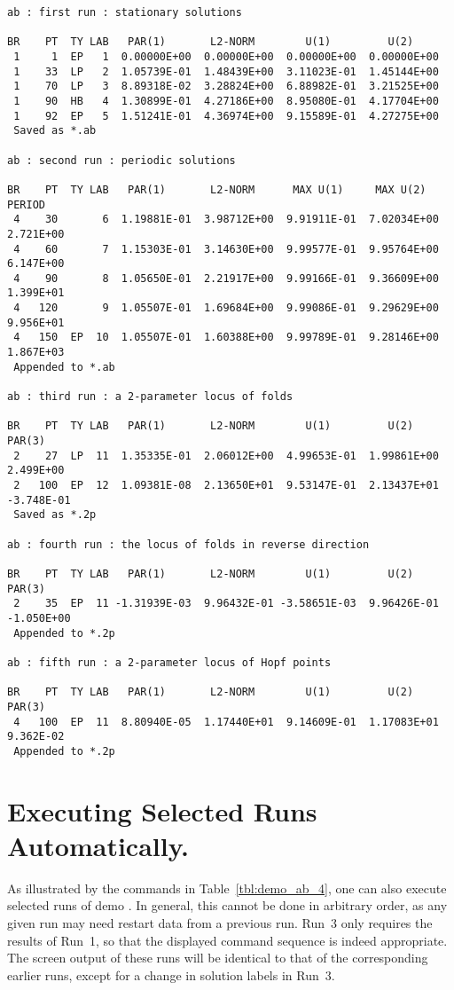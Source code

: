 \begin{center}
\vspace{-0.2in}
\begin{verbatim}
ab : first run : stationary solutions
 
BR    PT  TY LAB   PAR(1)       L2-NORM        U(1)         U(2)     
 1     1  EP   1  0.00000E+00  0.00000E+00  0.00000E+00  0.00000E+00
 1    33  LP   2  1.05739E-01  1.48439E+00  3.11023E-01  1.45144E+00
 1    70  LP   3  8.89318E-02  3.28824E+00  6.88982E-01  3.21525E+00
 1    90  HB   4  1.30899E-01  4.27186E+00  8.95080E-01  4.17704E+00
 1    92  EP   5  1.51241E-01  4.36974E+00  9.15589E-01  4.27275E+00
 Saved as *.ab
 
ab : second run : periodic solutions
 
BR    PT  TY LAB   PAR(1)       L2-NORM      MAX U(1)     MAX U(2)     PERIOD    
 4    30       6  1.19881E-01  3.98712E+00  9.91911E-01  7.02034E+00  2.721E+00
 4    60       7  1.15303E-01  3.14630E+00  9.99577E-01  9.95764E+00  6.147E+00
 4    90       8  1.05650E-01  2.21917E+00  9.99166E-01  9.36609E+00  1.399E+01
 4   120       9  1.05507E-01  1.69684E+00  9.99086E-01  9.29629E+00  9.956E+01
 4   150  EP  10  1.05507E-01  1.60388E+00  9.99789E-01  9.28146E+00  1.867E+03
 Appended to *.ab
 
ab : third run : a 2-parameter locus of folds
 
BR    PT  TY LAB   PAR(1)       L2-NORM        U(1)         U(2)       PAR(3)     
 2    27  LP  11  1.35335E-01  2.06012E+00  4.99653E-01  1.99861E+00  2.499E+00
 2   100  EP  12  1.09381E-08  2.13650E+01  9.53147E-01  2.13437E+01 -3.748E-01
 Saved as *.2p
 
ab : fourth run : the locus of folds in reverse direction
 
BR    PT  TY LAB   PAR(1)       L2-NORM        U(1)         U(2)       PAR(3)     
 2    35  EP  11 -1.31939E-03  9.96432E-01 -3.58651E-03  9.96426E-01 -1.050E+00
 Appended to *.2p
 
ab : fifth run : a 2-parameter locus of Hopf points
 
BR    PT  TY LAB   PAR(1)       L2-NORM        U(1)         U(2)       PAR(3)     
 4   100  EP  11  8.80940E-05  1.17440E+01  9.14609E-01  1.17083E+01  9.362E-02
 Appended to *.2p
\end{verbatim}
\end{center}

\newpage

\section{ Executing Selected Runs Automatically.} \label{sec:Tutorial_selected_runs}
As illustrated by the commands in Table~\ref{tbl:demo_ab_4}, 
one can also execute selected runs of demo .
In general, this cannot be done in arbitrary order, as any given
run may need restart data from a previous run.
Run~3 only requires the results of Run~1, so that the displayed 
command sequence is indeed appropriate.
The screen output of these runs will be identical to that of
the corresponding earlier runs, except for a change in solution 
labels in Run~3.

